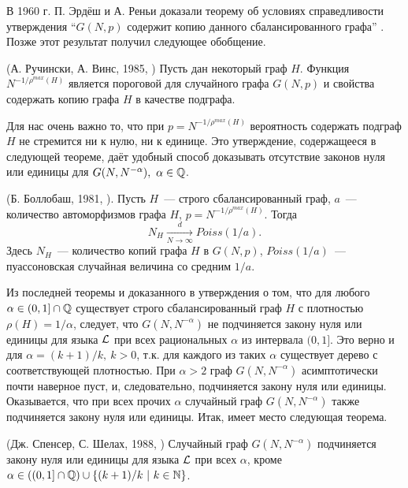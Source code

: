 В 1960 г. П. Эрдёш и А. Реньи
доказали теорему об условиях справедливости утверждения ``$G(N, p)$ содержит копию данного сбалансированного графа'' \cite{erdHos1976evolution}. 
Позже этот результат получил следующее обобщение.\\
\begin{theorem} (А. Ручински, А. Винс, 1985, \cite{rucinski1985balanced}) 
\label{th:ruchinski}
Пусть дан некоторый граф $H$.
Функция $N^{-1/\rho^{max}(H)}$ является пороговой для случайного графа $G(N,p)$ и свойства содержать копию графа $H$ в качестве подграфа.
\end{theorem}


Для нас очень важно то, что при $p = N^{-1/\rho^{max}(H)}$ вероятность содержать подграф $H$ не стремится ни к нулю, ни к единице.
Это утверждение, содержащееся в следующей теореме, даёт удобный способ доказывать отсутствие законов нуля или единицы для $G(N, N^{-\alpha}), ~\alpha \in \mathbb {Q}$.

\begin{theorem} (Б. Боллобаш, 1981, \cite{bollobas1981threshold}). 
\label{th:bollobash}
Пусть $H$~--- строго сбалансированный граф, $a$~--- количество автоморфизмов графа $H$, $p = N^{-1/ \rho^{max}(H)}$.
Тогда
\[N_H \xrightarrow[N\rightarrow \infty]{d} Poiss(1/a). \]
Здесь $N_H$~--- количество копий графа $H$ в $G(N, p)$, $Poiss(1/a)$~--- пуассоновская случайная величина со средним $1/a$.
\end{theorem}
Из последней теоремы и доказанного в \cite{rucinski1986strongly} утверждения о том, что для любого $\alpha \in (0,1] \cap \mathbb {Q}$ существует строго сбалансированный граф $H$ с плотностью $\rho(H) = 1/\alpha$, следует, что $G(N,N^{-\alpha})$ не подчиняется закону нуля или единицы для языка $\mathcal{L}$ при всех рациональных $\alpha$ из интервала $(0,1]$.
Это верно и для $\alpha = (k+1)/k,~ k > 0$, т.к. для каждого из таких $\alpha$ существует дерево с соответствующей плотностью.
При $\alpha > 2$ граф $G(N, N^{-\alpha})$ асимптотически почти наверное пуст, и, следовательно, подчиняется закону нуля или единицы.
Оказывается, что при всех прочих $\alpha$ случайный граф $G(N, N^{-\alpha})$ также подчиняется закону нуля или единицы.
Итак, имеет место следующая теорема.
\begin{theorem} (Дж. Спенсер, С. Шелах, 1988, \cite{shelah1988zero})
\label{th:spencer}
Случайный граф $G(N, N^{-\alpha})$ подчиняется закону нуля или единицы для языка $\mathcal{L}$ при всех $\alpha$, кроме $\alpha \in \left((0,1] \cap \mathbb {Q} \right) \cup \{(k+1)/k ~|~ k \in \mathbb {N} \}$.
\end{theorem}

